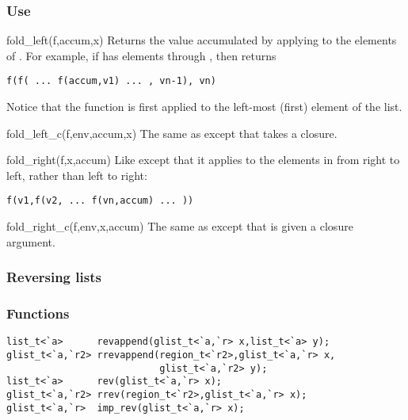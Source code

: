 \subsubsection*{Use}

\begin{defun}{fold_left}{(f,accum,x)}
Returns the value accumulated by applying  to the elements of
.  For example, if  has elements  through
, then  returns

\begin{verbatim}
f(f( ... f(accum,v1) ... , vn-1), vn)
\end{verbatim}

\noindent Notice that the function is first applied to the left-most (first)
element of the list.
\end{defun}

\begin{defun}{fold_left_c}{(f,env,accum,x)}
The same as  except that  takes a closure.
\end{defun}

\begin{defun}{fold_right}{(f,x,accum)}
Like  except that it applies  to the elements
in  from right to left, rather than left to right:

\begin{verbatim}
f(v1,f(v2, ... f(vn,accum) ... ))
\end{verbatim}
\end{defun}

\begin{defun}{fold_right_c}{(f,env,x,accum)}
The same as  except that  is given a closure
argument.
\end{defun}


\subsubsection*{Reversing lists}
\subsubsection*{Functions}
\begin{verbatim}
list_t<`a>      revappend(glist_t<`a,`r> x,list_t<`a> y);
glist_t<`a,`r2> rrevappend(region_t<`r2>,glist_t<`a,`r> x,
                           glist_t<`a,`r2> y);
list_t<`a>      rev(glist_t<`a,`r> x);
glist_t<`a,`r2> rrev(region_t<`r2>,glist_t<`a,`r> x);
glist_t<`a,`r>  imp_rev(glist_t<`a,`r> x);
\end{verbatim}

